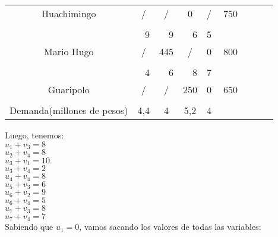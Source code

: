 \documentclass[12pt,letterpaper]{article}
\begin{document}
\begin{center}
\begin{tabular}{ccc|ccc|ccc|ccc|ccc|ccc|ccc}
\multicolumn{3}{c|}{Huachimingo} & \multicolumn{3}{c|}{/} & \multicolumn{3}{c|}{/} & \multicolumn{3}{c|}{0} & \multicolumn{3}{c|}{/}& \multicolumn{3}{c}{750}\\
\multicolumn{3}{c|}{} & \multicolumn{3}{c|}{} & \multicolumn{3}{c|}{} & \multicolumn{3}{c|}{} & \multicolumn{3}{c|}{}\\
\cline{1-15}
\multicolumn{3}{c|}{} & \multicolumn{3}{r|}{9} & \multicolumn{3}{r|}{9} & \multicolumn{3}{r|}{6} & \multicolumn{3}{r|}{5} \\
\multicolumn{3}{c|}{Mario Hugo} & \multicolumn{3}{c|}{/} & \multicolumn{3}{c|}{445} & \multicolumn{3}{c|}{/} & \multicolumn{3}{c|}{0}& \multicolumn{3}{c}{800}\\
\multicolumn{3}{c|}{} & \multicolumn{3}{c|}{} & \multicolumn{3}{c|}{} & \multicolumn{3}{c|}{} & \multicolumn{3}{c|}{}\\
\cline{1-15}
\multicolumn{3}{c|}{} & \multicolumn{3}{r|}{4} & \multicolumn{3}{r|}{6} & \multicolumn{3}{r|}{8} & \multicolumn{3}{r|}{7} \\
\multicolumn{3}{c|}{Guaripolo} & \multicolumn{3}{c|}{/} & \multicolumn{3}{c|}{/} & \multicolumn{3}{c|}{250} & \multicolumn{3}{c|}{0}& \multicolumn{3}{c}{650}\\
\multicolumn{3}{c|}{} & \multicolumn{3}{c|}{} & \multicolumn{3}{c|}{} & \multicolumn{3}{c|}{} & \multicolumn{3}{c|}{}\\
\cline{1-15}
\multicolumn{3}{c|}{Demanda(millones de pesos)} & \multicolumn{3}{c|}{4,4} & \multicolumn{3}{c|}{4} & \multicolumn{3}{c|}{5,2}& \multicolumn{3}{c|}{4} & \multicolumn{3}{c}{}\\

\end{tabular}
\end{center}

Luego, tenemos: \\

$u_{1}+v_{3}=8$ \\
$u_{2}+v_{4}=8$ \\
$u_{3}+v_{1}=10$ \\
$u_{3}+v_{4}=2$ \\
$u_{4}+v_{4}=8$ \\
$u_{5}+v_{3}=6$ \\
$u_{6}+v_{2}=9$ \\
$u_{6}+v_{4}=5$ \\
$u_{7}+v_{3}=8$ \\
$u_{7}+v_{4}=7$ \\

Sabiendo que $u_{1}=0$, vamos sacando los valores de todas las variables: \\
\end{document}
